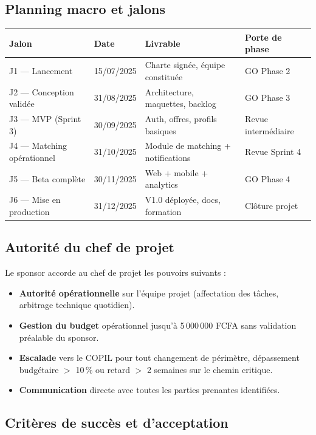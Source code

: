 \documentclass[11pt,a4paper]{article}
\begin{document}
\subsection{Planning macro et jalons}

\small
\begin{tabularx}{\textwidth}{|p{2.5cm}|p{2.5cm}|X|p{2.5cm}|}
    \hline
    \rowcolor{ifrigray}
    \textbf{Jalon} & \textbf{Date} & \textbf{Livrable} & \textbf{Porte de phase} \\
    \hline
    J1 --- Lancement & 15/07/2025 & Charte signée, équipe constituée & GO Phase 2 \\
    \hline
    J2 --- Conception validée & 31/08/2025 & Architecture, maquettes, backlog & GO Phase 3 \\
    \hline
    J3 --- MVP (Sprint 3) & 30/09/2025 & Auth, offres, profils basiques & Revue intermédiaire \\
    \hline
    J4 --- Matching opérationnel & 31/10/2025 & Module de matching + notifications & Revue Sprint 4 \\
    \hline
    J5 --- Beta complète & 30/11/2025 & Web + mobile + analytics & GO Phase 4 \\
    \hline
    J6 --- Mise en production & 31/12/2025 & V1.0 déployée, docs, formation & Clôture projet \\
    \hline
\end{tabularx}
\normalsize

\subsection{Autorité du chef de projet}

Le sponsor accorde au chef de projet les pouvoirs suivants :
\begin{itemize}
    \item \textbf{Autorité opérationnelle} sur l'équipe projet (affectation des tâches, arbitrage technique quotidien).
    \item \textbf{Gestion du budget} opérationnel jusqu'à 5\,000\,000 FCFA sans validation préalable du sponsor.
    \item \textbf{Escalade} vers le COPIL pour tout changement de périmètre, dépassement budgétaire $>$ 10\,\% ou retard $>$ 2 semaines sur le chemin critique.
    \item \textbf{Communication} directe avec toutes les parties prenantes identifiées.
\end{itemize}

\subsection{Critères de succès et d'acceptation}
\end{document}
